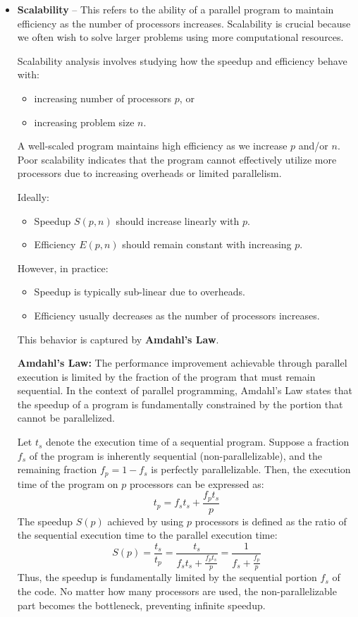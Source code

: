 \documentclass[12pt]{book}
\begin{document}
\begin{itemize}
\item \textbf{Scalability} -- This refers to the ability of a parallel program to maintain efficiency as the number of processors increases. Scalability is crucial because we often wish to solve larger problems using more computational resources.

Scalability analysis involves studying how the speedup and efficiency behave with:
\begin{itemize}
    \item increasing number of processors $p$, or
    \item increasing problem size $n$.
\end{itemize}

A well-scaled program maintains high efficiency as we increase $p$ and/or $n$. Poor scalability indicates that the program cannot effectively utilize more processors due to increasing overheads or limited parallelism.

Ideally:
\begin{itemize}
    \item Speedup $S(p,n)$ should increase linearly with $p$.
    \item Efficiency $E(p,n)$ should remain constant with increasing $p$.
\end{itemize}

However, in practice:
\begin{itemize}
    \item Speedup is typically sub-linear due to overheads.
    \item Efficiency usually decreases as the number of processors increases.
\end{itemize}

This behavior is captured by \textbf{Amdahl's Law}.

\textbf{Amdahl's Law:} The performance improvement achievable through parallel execution is limited by the fraction of the program that must remain sequential. In the context of parallel programming, Amdahl's Law states that the speedup of a program is fundamentally constrained by the portion that cannot be parallelized.

Let $t_s$ denote the execution time of a sequential program. Suppose a fraction $f_s$ of the program is inherently sequential (non-parallelizable), and the remaining fraction $f_p = 1 - f_s$ is perfectly parallelizable. Then, the execution time of the program on $p$ processors can be expressed as:
\[
t_p = f_s t_s + \frac{f_p t_s}{p}
\]
The speedup $S(p)$ achieved by using $p$ processors is defined as the ratio of the sequential execution time to the parallel execution time:
\[
S(p) = \frac{t_s}{t_p} = \frac{t_s}{f_s t_s + \frac{f_p t_s}{p}} = \frac{1}{f_s + \frac{f_p}{p}}
\]
Thus, the speedup is fundamentally limited by the sequential portion $f_s$ of the code. No matter how many processors are used, the non-parallelizable part becomes the bottleneck, preventing infinite speedup.


\end{itemize}
\end{document}
